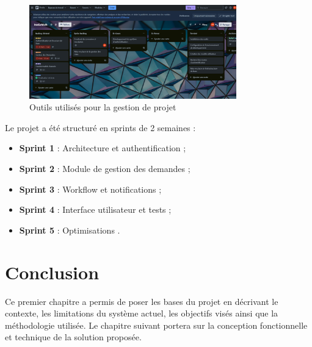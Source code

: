 \begin{figure}[H]
    \centering
    \includegraphics[width=0.8\textwidth]{images/Trello/Trello-Irescomath.png}
    \caption{Outils utilisés pour la gestion de projet}
    \label{fig:outils}
\end{figure}

Le projet a été structuré en sprints de 2 semaines :
\begin{itemize}
  \item \textbf{Sprint 1} : Architecture et authentification ;
  \item \textbf{Sprint 2} : Module de gestion des demandes ;
  \item \textbf{Sprint 3} : Workflow et notifications ;
  \item \textbf{Sprint 4} : Interface utilisateur et tests ;
  \item \textbf{Sprint 5} : Optimisations .
\end{itemize}
\section{Conclusion}

Ce premier chapitre a permis de poser les bases du projet en décrivant le contexte, les limitations du système actuel, les objectifs visés ainsi que la méthodologie utilisée. Le chapitre suivant portera sur la conception fonctionnelle et technique de la solution proposée.
